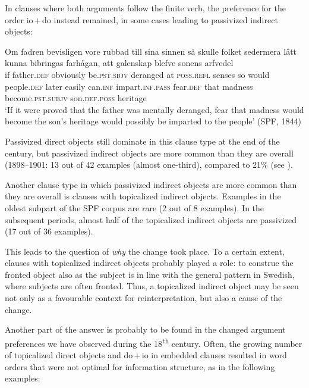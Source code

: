 \documentclass[output=paper]{langscibook}
\begin{document}
In clauses where both arguments follow the finite verb, the preference for the order io\,+\,do instead remained, in some cases leading to passivized indirect objects:

\ea%
    \label{ex:falk:25}
\gll Om  fadren    bevisligen    vore            rubbad    till    sina      sinnen  så skulle folket      sedermera  lätt      kunna    bibringas    farhågan,  att galenskap blefve              sonens          arfvedel\\
    if    father\textsc{.def}  obviously      be.\textsc{pst.sbjv}    deranged  at    \textsc{poss}.\textsc{refl}  senses  so         would people.\textsc{def}   later        easily    can.\textsc{inf}    impart.\textsc{inf.pass}  fear.\textsc{def}    that         madness   become.\textsc{pst.subjv}  son.\textsc{def.poss}  heritage  \\
\glt ‘If it were proved that the father was mentally deranged, fear that madness would become the son’s heritage would possibly be imparted to the people’ (SPF, 1844)
\z

Passivized direct objects still dominate in this clause type at the end of the century, but passivized indirect objects are more common than they are overall (1898–1901: 13 out of 42 examples (almost one-third), compared to 21\% (see ).


Another clause type in which passivized indirect objects are more common than they are overall is clauses with topicalized indirect objects. Examples in the oldest subpart of the SPF corpus are rare (2 out of 8 examples). In the subsequent periods, almost half of the topicalized indirect objects are passivized (17 out of 36 examples).



This leads to the question of \textit{why} the change took place. To a certain extent, clauses with topicalized indirect objects probably played a role: to construe the fronted object also as the subject is in line with the general pattern in Swedish, where subjects are often fronted. Thus, a topicalized indirect object may be seen not only as a favourable context for reinterpretation, but also a cause of the change.



Another part of the answer is probably to be found in the changed argument preferences we have observed during the 18\textsuperscript{th} century. Often, the growing number of topicalized direct objects and do\,+\,io in embedded clauses resulted in word orders that were not optimal for information structure, as in the following examples:
\end{document}
